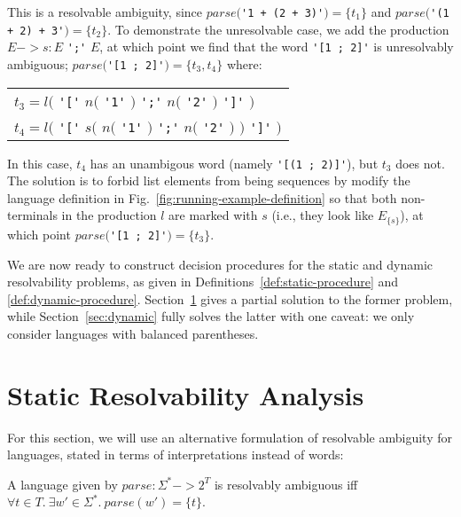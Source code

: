 \documentclass[acmsmall,review,anonymous]{acmart}\settopmatter{printfolios=true,printccs=false,printacmref=false}
\newcommand{\T}{\Sigma} %
\newcommand{\parse}{\mathit{parse}} %
\begin{document}
\noindent This is a resolvable ambiguity, since $\parse($\verb|'1 + (2 + 3)'|$) = \{t_1\}$ and $\parse($\verb|'(1 + 2) + 3'|$) = \{t_2\}$. To demonstrate the unresolvable case, we add the production $E -> s: E$ \verb|';'| $E$, at which point we find that the word \verb|'[1 ; 2]'| is unresolvably ambiguous; $\parse($\verb|'[1 ; 2]'|$) = \{t_3, t_4\}$ where:

\begin{center}
  \begin{tabular}{l}
    $t_3 = l($ \verb|'['| \hphantom{$s($} $n($ \verb|'1'| $)$ \verb|';'| $n($ \verb|'2'| $)$ \hphantom{$)$} \verb|']'| $)$ \\
    $t_4 = l($ \verb|'['| $s($ $n($ \verb|'1'| $)$ \verb|';'| $n($ \verb|'2'| $)$ $)$ \verb|']'| $)$ \\
  \end{tabular}
\end{center}

\noindent In this case, $t_4$ has an unambigous word (namely \verb|'[(1 ; 2)]'|), but $t_3$ does not. The solution is to forbid list elements from being sequences by modify the language definition in Fig.~\ref{fig:running-example-definition} so that both non-terminals in the production $l$ are marked with $s$ (i.e., they look like $E_{\{s\}}$), at which point $\parse($\verb|'[1 ; 2]'|$) = \{t_3\}$.

We are now ready to construct decision procedures for the static and dynamic resolvability problems, as given in Definitions~\ref{def:static-procedure} and \ref{def:dynamic-procedure}. Section~\ref{sec:static} gives a partial solution to the former problem, while Section~\ref{sec:dynamic} fully solves the latter with one caveat: we only consider languages with balanced parentheses.

\section{Static Resolvability Analysis} \label{sec:static}

For this section, we will use an alternative formulation of resolvable ambiguity for languages, stated in terms of interpretations instead of words:

\begin{theorem}
  A language given by $\parse : \T^{*} -> 2^T$ is resolvably ambiguous iff\\$\forall t \in T.\ \exists w' \in \T^{*}.\ \parse(w') = \{t\}$.
\end{theorem}
\end{document}
